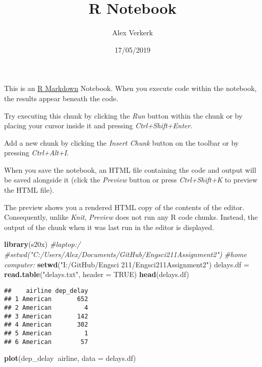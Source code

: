\documentclass[]{article}
\title{R Notebook}
\author{Alex Verkerk}
\date{17/05/2019}
\newenvironment{Shaded}{\begin{snugshade}}{\end{snugshade}}
\newcommand{\CommentTok}[1]{\textcolor[rgb]{0.56,0.35,0.01}{\textit{#1}}}
\newcommand{\DataTypeTok}[1]{\textcolor[rgb]{0.13,0.29,0.53}{#1}}
\newcommand{\KeywordTok}[1]{\textcolor[rgb]{0.13,0.29,0.53}{\textbf{#1}}}
\newcommand{\NormalTok}[1]{#1}
\newcommand{\OperatorTok}[1]{\textcolor[rgb]{0.81,0.36,0.00}{\textbf{#1}}}
\newcommand{\OtherTok}[1]{\textcolor[rgb]{0.56,0.35,0.01}{#1}}
\newcommand{\StringTok}[1]{\textcolor[rgb]{0.31,0.60,0.02}{#1}}
\begin{document}
\maketitle

This is an \href{http://rmarkdown.rstudio.com}{R Markdown} Notebook.
When you execute code within the notebook, the results appear beneath
the code.

Try executing this chunk by clicking the \emph{Run} button within the
chunk or by placing your cursor inside it and pressing
\emph{Ctrl+Shift+Enter}.

Add a new chunk by clicking the \emph{Insert Chunk} button on the
toolbar or by pressing \emph{Ctrl+Alt+I}.

When you save the notebook, an HTML file containing the code and output
will be saved alongside it (click the \emph{Preview} button or press
\emph{Ctrl+Shift+K} to preview the HTML file).

The preview shows you a rendered HTML copy of the contents of the
editor. Consequently, unlike \emph{Knit}, \emph{Preview} does not run
any R code chunks. Instead, the output of the chunk when it was last run
in the editor is displayed.

\begin{Shaded}
\begin{Highlighting}[]
\KeywordTok{library}\NormalTok{(s20x)}
\CommentTok{#laptop:/}
\CommentTok{#setwd("C:/Users/Alex/Documents/GitHub/Engsci211Assignment2")}
\CommentTok{#home computer:}
\KeywordTok{setwd}\NormalTok{(}\StringTok{"I:/GitHub/Engsci 211/Engsci211Assignment2"}\NormalTok{)}
\NormalTok{delays.df =}\StringTok{ }\KeywordTok{read.table}\NormalTok{(}\StringTok{"delays.txt"}\NormalTok{, }\DataTypeTok{header =} \OtherTok{TRUE}\NormalTok{)}
\KeywordTok{head}\NormalTok{(delays.df)}
\end{Highlighting}
\end{Shaded}

\begin{verbatim}
##    airline dep_delay
## 1 American       652
## 2 American         4
## 3 American       142
## 4 American       302
## 5 American         1
## 6 American        57
\end{verbatim}

\begin{Shaded}
\begin{Highlighting}[]
\KeywordTok{plot}\NormalTok{(dep_delay}\OperatorTok{~}\NormalTok{airline, }\DataTypeTok{data =}\NormalTok{ delays.df)}
\end{Highlighting}
\end{Shaded}
\end{document}
